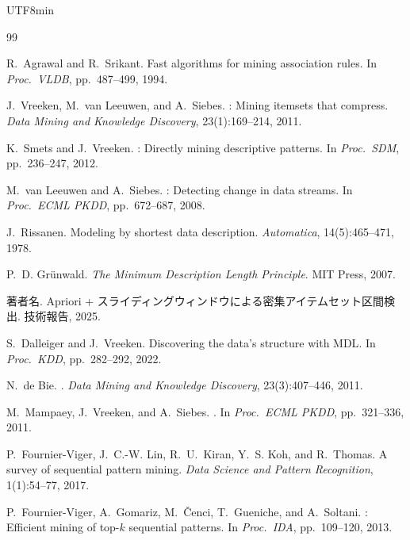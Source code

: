 \documentclass[11pt,a4paper]{article}
\begin{document}
\begin{CJK}{UTF8}{min}
\begin{thebibliography}{99}

R.~Agrawal and R.~Srikant.
\newblock Fast algorithms for mining association rules.
\newblock In \emph{Proc.\ VLDB}, pp.\ 487--499, 1994.

J.~Vreeken, M.~van Leeuwen, and A.~Siebes.
: Mining itemsets that compress.
\newblock \emph{Data Mining and Knowledge Discovery}, 23(1):169--214, 2011.

K.~Smets and J.~Vreeken.
: Directly mining descriptive patterns.
\newblock In \emph{Proc.\ SDM}, pp.\ 236--247, 2012.

M.~van Leeuwen and A.~Siebes.
: Detecting change in data streams.
\newblock In \emph{Proc.\ ECML PKDD}, pp.\ 672--687, 2008.

J.~Rissanen.
\newblock Modeling by shortest data description.
\newblock \emph{Automatica}, 14(5):465--471, 1978.

P.~D. Gr{\"u}nwald.
\newblock \emph{The Minimum Description Length Principle}.
\newblock MIT Press, 2007.

著者名.
\newblock Apriori + スライディングウィンドウによる密集アイテムセット区間検出.
\newblock 技術報告, 2025.

S.~Dalleiger and J.~Vreeken.
\newblock Discovering the data's structure with {MDL}.
\newblock In \emph{Proc.\ KDD}, pp.\ 282--292, 2022.

N.~de Bie.
.
\newblock \emph{Data Mining and Knowledge Discovery}, 23(3):407--446, 2011.

M.~Mampaey, J.~Vreeken, and A.~Siebes.
.
\newblock In \emph{Proc.\ ECML PKDD}, pp.\ 321--336, 2011.

P.~Fournier-Viger, J.~C.-W. Lin, R.~U.~Kiran, Y.~S. Koh, and R.~Thomas.
\newblock A survey of sequential pattern mining.
\newblock \emph{Data Science and Pattern Recognition}, 1(1):54--77, 2017.

P.~Fournier-Viger, A.~Gomariz, M.~\v{C}enci, T.~Gueniche, and A.~Soltani.
: Efficient mining of top-$k$ sequential patterns.
\newblock In \emph{Proc.\ IDA}, pp.\ 109--120, 2013.


\end{thebibliography}
\end{CJK}
\end{document}
